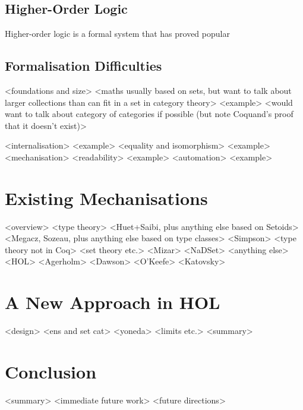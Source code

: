 \documentclass[twoside,titlepage,11pt]{article}
\begin{document}
\subsection{Higher-Order Logic}%
Higher-order logic is a formal system that has proved popular
\subsection{Formalisation Difficulties}%
<foundations and size>%
  <maths usually based on sets, but want to talk about larger collections than can fit in a set in category theory>
  <example>
  <would want to talk about category of categories if possible (but note Coquand's proof that it doesn't exist)>

<internalisation>%
  <example>
<equality and isomorphism>%
  <example>
<mechanisation>
  <readability>%
    <example>
  <automation>%
    <example>
\section{Existing Mechanisations}%
<overview>%
<type theory>%
  <Huet+Saibi, plus anything else based on Setoids>%
  <Megacz, Sozeau, plus anything else based on type classes>%
  <Simpson>%
  <type theory not in Coq>%
<set theory etc.>%
  <Mizar>%
  <NaDSet>%
  <anything else>%
<HOL>%
  <Agerholm>%
  <Dawson>%
  <O'Keefe>%
  <Katovsky>%
\section{A New Approach in HOL}%
<design>%
<ens and set cat>%
<yoneda>%
<limits etc.>%
<summary>%
\section{Conclusion}%
<summary>%
<immediate future work>%
<future directions>%


\end{document}
